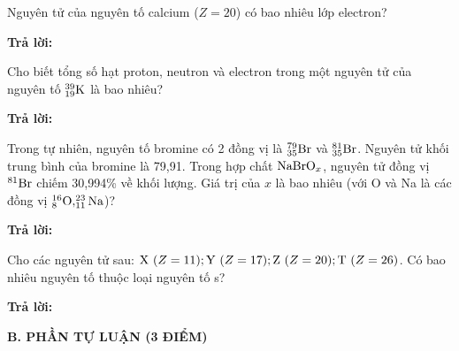 \documentclass[11pt,a4paper]{article}
\begin{document}
\begin{ex}
Nguyên tử của nguyên tố calcium ($Z = 20$) có bao nhiêu lớp electron?
\par\textbf{Trả lời:} \dotfill\end{ex}
\begin{ex}
Cho biết tổng số hạt proton, neutron và electron trong một nguyên tử của nguyên tố $^{39}_{19}\ce{K}$ là bao nhiêu?
\par\textbf{Trả lời:} \dotfill\end{ex}
\begin{ex}
Trong tự nhiên, nguyên tố bromine có 2 đồng vị là $^{79}_{35}\ce{Br}$ và $^{81}_{35}\ce{Br}$. Nguyên tử khối trung bình của bromine là 79,91. Trong hợp chất $\ce{NaBrO}_x$, nguyên tử đồng vị $^{81}\ce{Br}$ chiếm 30,994\% về khối lượng. Giá trị của $x$ là bao nhiêu (với O và Na là các đồng vị $^{16}_8\ce{O}, ^{23}_{11}\ce{Na}$)?
\par\textbf{Trả lời:} \dotfill\end{ex}
\begin{ex}
Cho các nguyên tử sau: $\ce{X}\ (Z = 11); \ce{Y}\ (Z = 17); \ce{Z}\ (Z = 20); \ce{T}\ (Z = 26)$. Có bao nhiêu nguyên tố thuộc loại nguyên tố s?
\par\textbf{Trả lời:} \dotfill\end{ex}
\vspace{6pt}
\noindent
{\color{mainGreen}\textbf{\Large B. PHẦN TỰ LUẬN (3 ĐIỂM)}}
\vspace{3pt}
\end{document}
